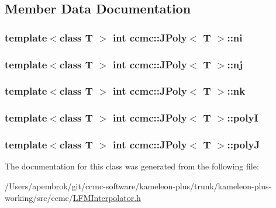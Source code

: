 \subsection{Member Data Documentation}
\hypertarget{classccmc_1_1_j_poly_a0bb48597758d01c4e439500780d101a7}{
\subsubsection[{ni}]{\setlength{\rightskip}{0pt plus 5cm}template$<$class T $>$ int {\bf ccmc\-::\-J\-Poly}$<$ T $>$\-::ni}}\label{classccmc_1_1_j_poly_a0bb48597758d01c4e439500780d101a7}
\hypertarget{classccmc_1_1_j_poly_aa7a29fd9cf2e058faa58309ae35fce5c}{
\subsubsection[{nj}]{\setlength{\rightskip}{0pt plus 5cm}template$<$class T $>$ int {\bf ccmc\-::\-J\-Poly}$<$ T $>$\-::nj}}\label{classccmc_1_1_j_poly_aa7a29fd9cf2e058faa58309ae35fce5c}
\hypertarget{classccmc_1_1_j_poly_a6870b304bbe9257d99d0a7aa02b11f37}{
\subsubsection[{nk}]{\setlength{\rightskip}{0pt plus 5cm}template$<$class T $>$ int {\bf ccmc\-::\-J\-Poly}$<$ T $>$\-::nk}}\label{classccmc_1_1_j_poly_a6870b304bbe9257d99d0a7aa02b11f37}
\hypertarget{classccmc_1_1_j_poly_a6a1be93e848453b2f5708cfe58fc9734}{
\subsubsection[{poly\-I}]{\setlength{\rightskip}{0pt plus 5cm}template$<$class T $>$ int {\bf ccmc\-::\-J\-Poly}$<$ T $>$\-::poly\-I}}\label{classccmc_1_1_j_poly_a6a1be93e848453b2f5708cfe58fc9734}
\hypertarget{classccmc_1_1_j_poly_ab127c7226a977fb88668fa22f4acfd93}{
\subsubsection[{poly\-J}]{\setlength{\rightskip}{0pt plus 5cm}template$<$class T $>$ int {\bf ccmc\-::\-J\-Poly}$<$ T $>$\-::poly\-J}}\label{classccmc_1_1_j_poly_ab127c7226a977fb88668fa22f4acfd93}


The documentation for this class was generated from the following file\-:\begin{DoxyCompactItemize}
\item 
/\-Users/apembrok/git/ccmc-\/software/kameleon-\/plus/trunk/kameleon-\/plus-\/working/src/ccmc/\hyperlink{_l_f_m_interpolator_8h}{L\-F\-M\-Interpolator.\-h}\end{DoxyCompactItemize}
